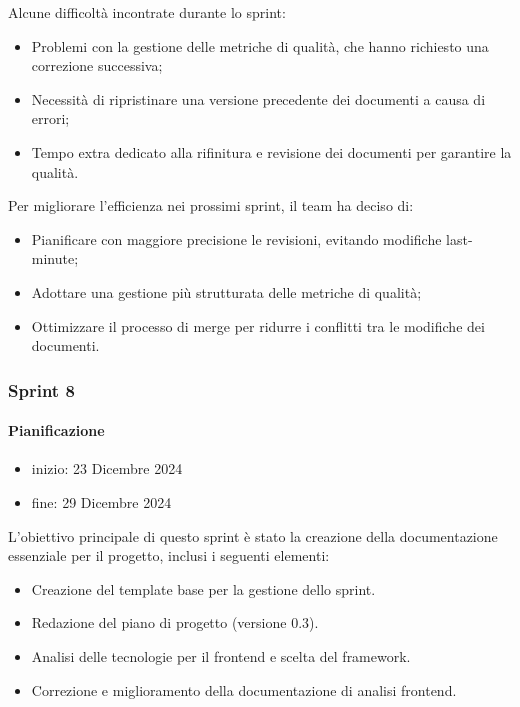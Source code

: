 \documentclass{article}
\begin{document}
                Alcune difficoltà incontrate durante lo sprint:
                \begin{itemize}
                    \item Problemi con la gestione delle metriche di qualità, che hanno richiesto una correzione successiva;
                    \item Necessità di ripristinare una versione precedente dei documenti a causa di errori;
                    \item Tempo extra dedicato alla rifinitura e revisione dei documenti per garantire la qualità.
                \end{itemize}
                
                Per migliorare l'efficienza nei prossimi sprint, il team ha deciso di:
                \begin{itemize}
                    \item Pianificare con maggiore precisione le revisioni, evitando modifiche last-minute;
                    \item Adottare una gestione più strutturata delle metriche di qualità;
                    \item Ottimizzare il processo di merge per ridurre i conflitti tra le modifiche dei documenti.
                \end{itemize}
            \subsubsection{Sprint 8}
                \paragraph{Pianificazione}
                \begin{itemize}
                    \item inizio: 23 Dicembre 2024
                    \item fine: 29 Dicembre 2024
                \end{itemize}
                L'obiettivo principale di questo sprint è stato la creazione della documentazione essenziale per il progetto, inclusi i seguenti elementi:
                \begin{itemize}
                    \item Creazione del template base per la gestione dello sprint.
                    \item Redazione del piano di progetto (versione 0.3).
                    \item Analisi delle tecnologie per il frontend e scelta del framework.
                    \item Correzione e miglioramento della documentazione di analisi frontend.
                \end{itemize}
                
\end{document}
